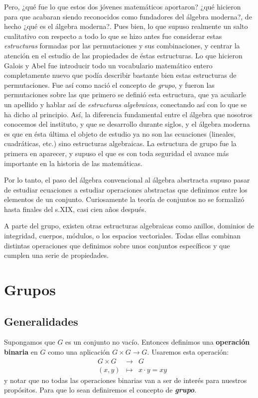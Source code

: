 \documentclass[12pt]{article}
\begin{document}
Pero, ¿qué fue lo que estos dos jóvenes matemáticos aportaron? ¿qué hicieron para que acabaran siendo reconocidos como fundadores del álgebra moderna?, de hecho ¿qué es el álgebra moderna?. Pues bien, lo que supuso realmente un salto cualitativo con respecto a todo lo que se hizo antes fue considerar estas \textit{estructuras} formadas por las permutaciones y sus combinaciones, y centrar la atención en el estudio de las propiedades de éstas estructuras. Lo que hicieron Galois y Abel fue introducir todo un vocabulario matemático entero completamente nuevo que podía describir bastante bien estas estructuras de permutaciones. Fue así como nació el concepto de \textit{grupo}, y fueron las permutaciones sobre las que primero se definió esta estructura, que ya acuñarle un apellido y hablar así de \textit{estructuras algebraicas}, conectando así con lo que se ha dicho al principio. Así, la diferencia fundamental entre el álgebra que nosotros conocemos del instituto, y que se desarrollo durante siglos, y el álgebra moderna es que en ésta última el objeto de estudio ya no son las ecuaciones (lineales, cuadráticas, etc.) sino estructuras algebraicas. La estructura de grupo fue la primera en aparecer, y supuso el que es con toda seguridad el avance más importante en la historia de las matemáticas.

Por lo tanto, el paso del álgebra convencional al álgebra absrtracta supuso pasar de estudiar ecuaciones a estudiar operaciones abstractas que definimos entre los elementos de un conjunto. Curiosamente la teoría de conjuntos no se formalizó hasta finales del s.XIX, casi cien años después. 

A parte del grupo, existen otras estructuras algebraicas como anillos, dominios de integridad, cuerpos, módulos, o los espacios vectoriales. Todas ellas combinan distintas operaciones que definimos sobre unos conjuntos específicos y que cumplen una serie de propiedades.

\section{Grupos}
\subsection{Generalidades}

Supongamos que $G$ es un conjunto no vacío. Entonces definimos una \textbf{operación binaria} en $G$ como una aplicación $G \times G \longrightarrow G$. Usaremos esta operación:
 $$\begin{array}{rccl}
&G \times G&\longrightarrow &G \\
&(x,y)& \longmapsto &x\cdot y = xy
\end{array}
$$
y notar que no todas las operaciones binarias van a ser de interés para nuestros propósitos. Para que lo sean definiremos el concepto de \textbf{\textit{grupo}}.
\end{document}
